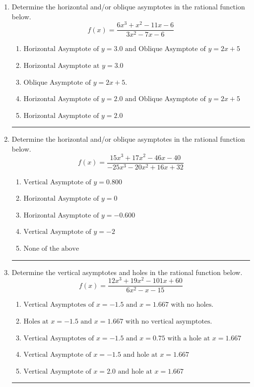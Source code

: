 \documentclass[14pt]{extbook}
\newcommand{\litem}[1]{\item#1\hspace*{-1cm}\rule{\textwidth}{0.4pt}}
\begin{document}
\begin{enumerate}
{\begin{enumerate}[label=\Alph*.]
\end{enumerate} }
\litem{
Determine the horizontal and/or oblique asymptotes in the rational function below.\[ f(x) = \frac{6x^{3} + x^{2} -11 x -6}{3x^{2} -7 x -6} \]\begin{enumerate}[label=\Alph*.]
\item \( \text{Horizontal Asymptote of } y = 3.0 \text{ and Oblique Asymptote of } y = 2x + 5 \)
\item \( \text{Horizontal Asymptote at } y = 3.0 \)
\item \( \text{Oblique Asymptote of } y = 2x + 5. \)
\item \( \text{Horizontal Asymptote of } y = 2.0 \text{ and Oblique Asymptote of } y = 2x + 5 \)
\item \( \text{Horizontal Asymptote of } y = 2.0  \)

\end{enumerate} }
\litem{
Determine the horizontal and/or oblique asymptotes in the rational function below.\[ f(x) = \frac{15x^{3} +17 x^{2} -46 x -40}{-25x^{3} -20 x^{2} +16 x + 32} \]\begin{enumerate}[label=\Alph*.]
\item \( \text{Vertical Asymptote of } y = 0.800  \)
\item \( \text{Horizontal Asymptote of } y = 0  \)
\item \( \text{Horizontal Asymptote of } y = -0.600  \)
\item \( \text{Vertical Asymptote of } y = -2  \)
\item \( \text{None of the above} \)

\end{enumerate} }
\litem{
Determine the vertical asymptotes and holes in the rational function below.\[ f(x) = \frac{12x^{3} +19 x^{2} -101 x + 60}{6x^{2} -x -15} \]\begin{enumerate}[label=\Alph*.]
\item \( \text{Vertical Asymptotes of } x = -1.5 \text{ and } x = 1.667 \text{ with no holes.} \)
\item \( \text{Holes at } x = -1.5 \text{ and } x = 1.667 \text{ with no vertical asymptotes.} \)
\item \( \text{Vertical Asymptotes of } x = -1.5 \text{ and } x = 0.75 \text{ with a hole at } x = 1.667 \)
\item \( \text{Vertical Asymptote of } x = -1.5 \text{ and hole at } x = 1.667 \)
\item \( \text{Vertical Asymptote of } x = 2.0 \text{ and hole at } x = 1.667 \)


\end{enumerate}}
\end{enumerate}
\end{document}
